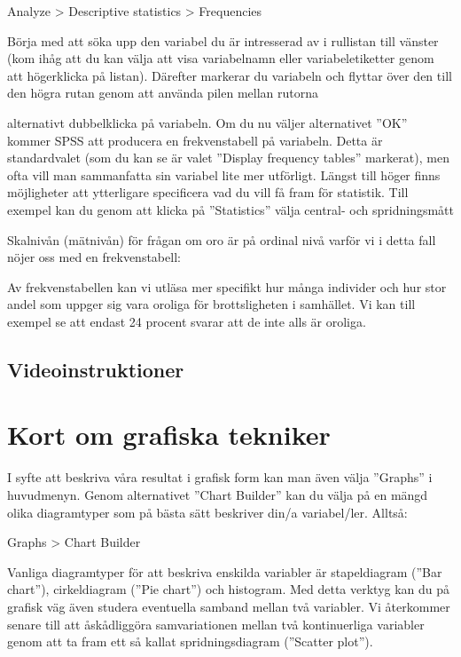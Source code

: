 \documentclass[
]{book}
\begin{document}
Analyze \textgreater{} Descriptive statistics \textgreater{} Frequencies

Börja med att söka upp den variabel du är intresserad av i rullistan till vänster (kom ihåg att du kan
välja att visa variabelnamn eller variabeletiketter genom att högerklicka på listan). Därefter markerar
du variabeln och flyttar över den till den högra rutan genom att använda pilen mellan rutorna

alternativt dubbelklicka på variabeln. Om du nu väljer alternativet ''OK'' kommer SPSS att producera en
frekvenstabell på variabeln. Detta är standardvalet (som du kan se är valet ''Display frequency tables''
markerat), men ofta vill man sammanfatta sin variabel lite mer utförligt. Längst till höger finns
möjligheter att ytterligare specificera vad du vill få fram för statistik. Till exempel kan du genom att
klicka på ''Statistics'' välja central- och spridningsmått

Skalnivån (mätnivån) för frågan om oro är på ordinal nivå varför vi i detta fall nöjer oss med en
frekvenstabell:

Av frekvenstabellen kan vi utläsa mer specifikt hur många individer och hur stor andel som uppger sig
vara oroliga för brottsligheten i samhället. Vi kan till exempel se att endast 24 procent svarar att de
inte alls är oroliga.

\hypertarget{videoinstruktioner-3}{%
\subsection{Videoinstruktioner}\label{videoinstruktioner-3}}

\hypertarget{kort-om-grafiska-tekniker}{%
\section{Kort om grafiska tekniker}\label{kort-om-grafiska-tekniker}}

I syfte att beskriva våra resultat i grafisk form kan man även välja ''Graphs'' i huvudmenyn. Genom
alternativet ''Chart Builder'' kan du välja på en mängd olika diagramtyper som på bästa sätt beskriver
din/a variabel/ler. Alltså:

Graphs \textgreater{} Chart Builder

Vanliga diagramtyper för att beskriva enskilda variabler är stapeldiagram (''Bar chart''), cirkeldiagram
(''Pie chart'') och histogram. Med detta verktyg kan du på grafisk väg även studera eventuella samband
mellan två variabler. Vi återkommer senare till att åskådliggöra samvariationen mellan två kontinuerliga
variabler genom att ta fram ett så kallat spridningsdiagram (''Scatter plot'').
\end{document}

